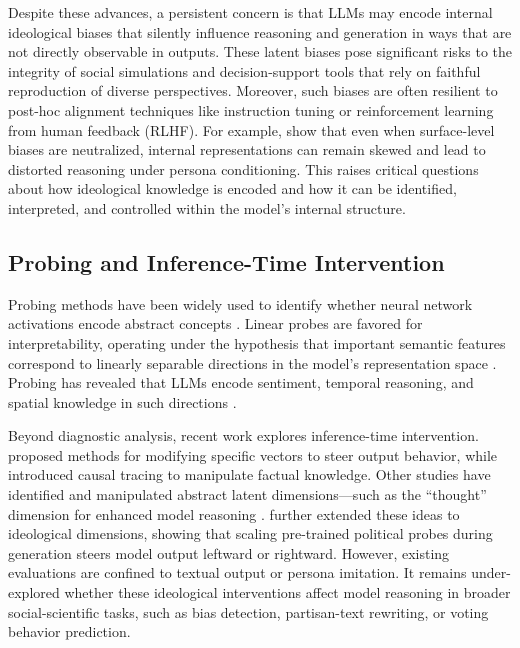 \documentclass[11pt]{article}
\begin{document}
Despite these advances, a persistent concern is that LLMs may encode internal ideological biases that silently influence reasoning and generation in ways that are not directly observable in outputs. These latent biases pose significant risks to the integrity of social simulations and decision-support tools that rely on faithful reproduction of diverse perspectives. Moreover, such biases are often resilient to post-hoc alignment techniques like instruction tuning or reinforcement learning from human feedback (RLHF). For example, \citet{guptaBiasRunsDeep2023} show that even when surface-level biases are neutralized, internal representations can remain skewed and lead to distorted reasoning under persona conditioning. This raises critical questions about how ideological knowledge is encoded and how it can be identified, interpreted, and controlled within the model’s internal structure.

\subsection{Probing and Inference-Time Intervention}

Probing methods have been widely used to identify whether neural network activations encode abstract concepts \citep{alainUnderstandingIntermediateLayers2016, belinkovProbingClassifiersPromises2022}. Linear probes are favored for interpretability, operating under the hypothesis that important semantic features correspond to linearly separable directions in the model’s representation space \citep{mikolov-etal-2013-linguistic, parkLinearRepresentationHypothesis2024}. Probing has revealed that LLMs encode sentiment, temporal reasoning, and spatial knowledge in such directions \citep{tiggesLinearRepresentationsSentiment2023, gurneeLanguageModelsRepresent2023, nandaEmergentLinearRepresentations2023, goldowsky-dillDetectingStrategicDeception2025}.

Beyond diagnostic analysis, recent work explores inference-time intervention. \citet{liInferenceTimeInterventionEliciting2023} proposed methods for modifying specific vectors to steer output behavior, while \citet{marksGeometryTruthEmergent2023} introduced causal tracing to manipulate factual knowledge. Other studies have identified and manipulated abstract latent dimensions—such as the “thought” dimension for enhanced model reasoning \citep{wangThoughtProbeClassifierGuidedThought2025}. \citet{kimLinearRepresentationsPolitical2025} further extended these ideas to ideological dimensions, showing that scaling pre-trained political probes during generation steers model output leftward or rightward. However, existing evaluations are confined to textual output or persona imitation. It remains under-explored whether these ideological interventions affect model reasoning in broader social-scientific tasks, such as bias detection, partisan-text rewriting, or voting behavior prediction.
\end{document}
